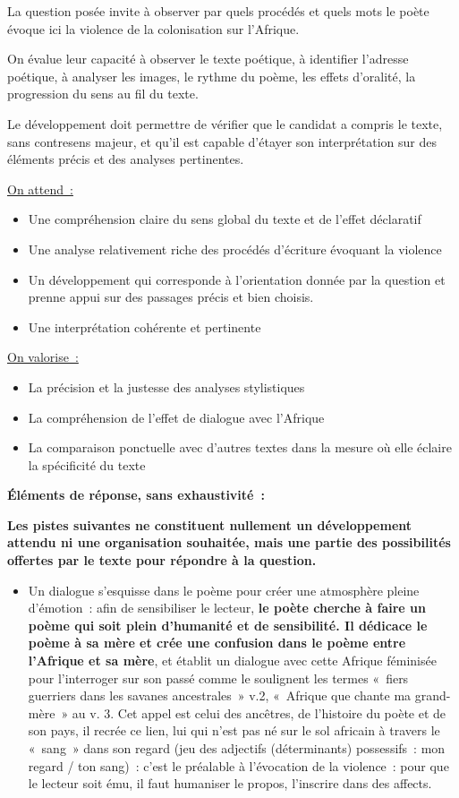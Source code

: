 {La question posée invite à observer par quels procédés et quels mots le poète évoque ici la violence
de la colonisation sur l'Afrique.

On évalue leur capacité à observer le texte poétique, à identifier l'adresse poétique, à analyser les
images, le rythme du poème, les effets d'oralité, la progression du sens au fil du texte.

Le développement doit permettre de vérifier que le candidat a compris le texte, sans contresens
majeur, et qu'il est capable d'étayer son interprétation sur des éléments précis et des analyses
pertinentes.

\underline{On attend~:}

\begin{itemize}
\item Une compréhension claire du sens global du texte et de l'effet déclaratif
\item Une analyse relativement riche des procédés d'écriture évoquant la violence
\item Un développement qui corresponde à l'orientation donnée par la question et prenne appui
sur des passages précis et bien choisis.
\item Une interprétation cohérente et pertinente
\end{itemize}

\underline{On valorise~:}

\begin{itemize}
\item La précision et la justesse des analyses stylistiques
\item La compréhension de l'effet de dialogue avec l'Afrique
\item La comparaison ponctuelle avec d'autres textes dans la mesure où elle éclaire la spécificité
du texte
\end{itemize}

\bigskip

\textbf{Éléments de réponse, sans exhaustivité~:}

\textbf{Les pistes suivantes ne constituent nullement un développement attendu ni une organisation
souhaitée, mais une partie des possibilités offertes par le texte pour répondre à la question.}

\begin{itemize}[label=\textbullet]
\item Un dialogue s'esquisse dans le poème pour créer une atmosphère pleine d'émotion~: afin
de sensibiliser le lecteur, \textbf{le poète cherche à faire un poème qui soit plein d'humanité et
de sensibilité. Il dédicace le poème à sa mère et crée une confusion dans le poème entre
l'Afrique et sa mère}, et établit un dialogue avec cette Afrique féminisée pour l'interroger
sur son passé comme le soulignent les termes «~fiers guerriers dans les savanes
ancestrales~» v.2, «~Afrique que chante ma grand-mère~» au v. 3. Cet appel est celui des
ancêtres, de l'histoire du poète et de son pays, il recrée ce lien, lui qui n'est pas né sur le
sol africain à travers le «~sang~» dans son regard (jeu des adjectifs (déterminants)
possessifs~: mon regard / ton sang)~: c'est le préalable à l'évocation de la violence~: pour
que le lecteur soit ému, il faut humaniser le propos, l'inscrire dans des affects.


\end{itemize}}
